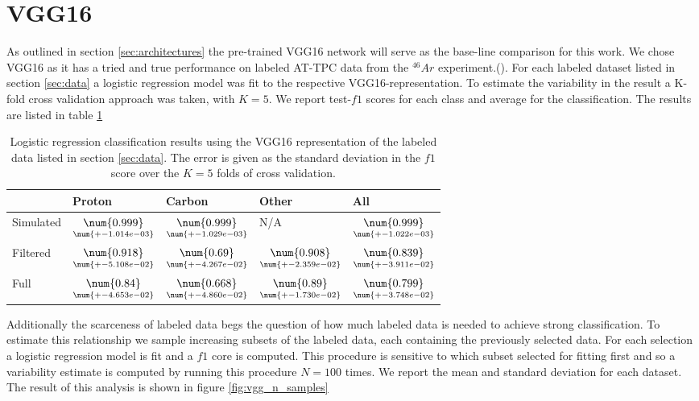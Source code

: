 \section{VGG16}

As outlined in section \ref{sec:architectures} the pre-trained VGG16 network will serve as the base-line comparison for this work. We chose VGG16 as it has a tried and true performance on labeled AT-TPC data from the $^{46}Ar$ experiment.(\cite{Kuchera2019}). For each labeled dataset listed in section \ref{sec:data} a logistic regression model was fit to the respective VGG16-representation. To estimate the variability in the result a K-fold cross validation approach was taken, with $K=5$. We report test-$f1$ scores for each class and average for the classification. The results are listed in table \ref{tab:vgg_results}

\begin{table}
\centering
\begin{tabular}{lllll}
\toprule
{} & Proton & Carbon & Other & All \\
\midrule
Simulated &  $\underset{\num{+- 1.014e-03 }  }{\num{ 0.999 } }$ &  $\underset{\num{+- 1.029e-03 }  }{\num{ 0.999 } }$ &  N/A &  $\underset{\num{+- 1.022e-03 }  }{\num{ 0.999 } }$ \\
Filtered  &  $\underset{\num{+- 5.108e-02 }  }{\num{ 0.918 } }$ &  $\underset{\num{+- 4.267e-02 }  }{\num{ 0.69 } }$ &  $\underset{\num{+- 2.359e-02 }  }{\num{ 0.908 } }$ &  $\underset{\num{+- 3.911e-02 }  }{\num{ 0.839 } }$ \\
Full      &  $\underset{\num{+- 4.653e-02 }  }{\num{ 0.84 } }$ &  $\underset{\num{+- 4.860e-02 }  }{\num{ 0.668 } }$ &  $\underset{\num{+- 1.730e-02 }  }{\num{ 0.89 } }$ &  $\underset{\num{+- 3.748e-02 }  }{\num{ 0.799 } }$ \\
\bottomrule
\end{tabular}
\caption[VGG classification results]{Logistic regression classification results using the VGG16 representation of the labeled data listed in section \ref{sec:data}. The error is given as the standard deviation in the $f1$ score over the $K=5$ folds of cross validation.}\label{tab:vgg_results}
\end{table}

 Additionally the scarceness of labeled data begs the question of how much labeled data is needed to achieve strong classification. To estimate this relationship we sample increasing subsets of the labeled data, each containing the previously selected data. For each selection a logistic regression model is fit and a $f1$ core is computed. This procedure is sensitive to which subset selected for fitting first and so a variability estimate is computed by running this procedure $N=100$ times. We report the mean and standard deviation for each dataset. The result of this analysis is shown in figure \ref{fig:vgg_n_samples}


